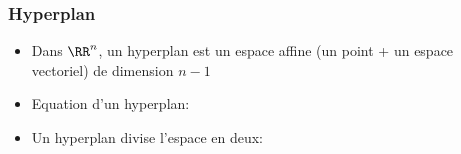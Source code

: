\documentclass[9pt,table]{beamer} %
\begin{document}
\begin{frame}
\frametitle{Hyperplan}

\begin{itemize}[label=\tiny$\blacksquare$]
	\item Dans $\RR^n$, un hyperplan est un espace affine (\ie un point + un espace vectoriel) de dimension $n-1$
	\vspace{-6mm}
	
	\item Equation d'un hyperplan:
	
	\item Un hyperplan divise l'espace en deux:
	
	
\end{itemize}

\end{frame}
\end{document}
